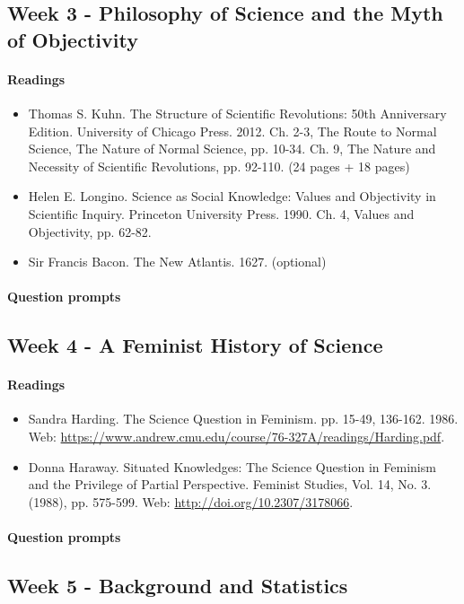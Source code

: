 \documentclass{article}
\begin{document}
\subsection{Week 3 - Philosophy of Science and the Myth of Objectivity}
\paragraph{Readings}
\begin{itemize}
\item Thomas S. Kuhn. The Structure of Scientific Revolutions: 50th Anniversary Edition. University of Chicago Press. 2012. Ch. 2-3, The Route to Normal Science, The Nature of Normal Science, pp. 10-34. Ch. 9, The Nature and Necessity of Scientific Revolutions, pp. 92-110. (24 pages + 18 pages)
\item Helen E. Longino. Science as Social Knowledge: Values and Objectivity in Scientific Inquiry. Princeton University Press. 1990. Ch. 4, Values and Objectivity, pp. 62-82.
\item Sir Francis Bacon. The New Atlantis. 1627. (optional)
\end{itemize}
\paragraph{Question prompts}


\subsection{Week 4 - A Feminist History of Science}
\paragraph{Readings}
\begin{itemize}
\item Sandra Harding. The Science Question in Feminism. pp. 15-49, 136-162. 1986. Web: \url{https://www.andrew.cmu.edu/course/76-327A/readings/Harding.pdf}.
\item Donna Haraway. Situated Knowledges: The Science Question in Feminism and the Privilege of Partial Perspective. Feminist Studies, Vol. 14, No. 3. (1988), pp. 575-599. Web: \url{http://doi.org/10.2307/3178066}.
\end{itemize}
\paragraph{Question prompts}


\subsection{Week 5 - Background and Statistics}
\end{document}
